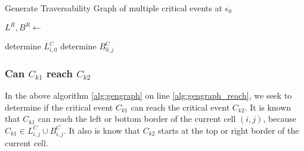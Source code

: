 \begin{algorithm}[H]
\caption{Generate Traversability Graph of multiple critical events at $\epsilon_0$}\label{alg:gengraph}
\begin{algorithmic}[1]

	\State{}
	

	
	\State $L^R, B^R \gets$ 

	\EndFor

	 {determine $L_{i, 0}^C$} \EndFor
	 {determine $B_{0,j}^C$} \EndFor
	 
			
					
					 \label{alg:gengraph_reach}
					\EndIf
					
				\EndFor
			\EndFor
			
		
		\EndFor
	\EndFor
	

\EndFunction

\end{algorithmic}
\end{algorithm}

\subsubsection{Can $C_{k1}$ reach $C_{k2}$}

In the above algorithm \ref{alg:gengraph} on line \ref{alg:gengraph_reach}, we seek to determine if the critical event $C_{k1}$ can reach the critical event $C_{k2}$. It is known that $C_{k1}$ can reach the left or bottom border of the current cell $(i, j)$, because $C_{k1} \in L_{i, j}^C \cup B_{i, j}^C$. It also is know that $C_{k2}$ starts at the top or right border of the current cell.

